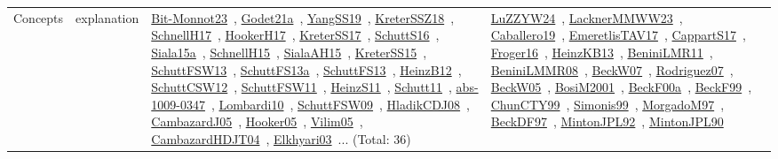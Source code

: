 {\begin{longtable}{lp{3cm}>{\raggedright\arraybackslash}p{6cm}>{\raggedright\arraybackslash}p{6cm}>{\raggedright\arraybackslash}p{8cm}}
\index{explanation}\index{Concepts!explanation}Concepts & explanation & \href{../works/Bit-Monnot23.pdf}{Bit-Monnot23}~\cite{Bit-Monnot23}, \href{../works/Godet21a.pdf}{Godet21a}~\cite{Godet21a}, \href{../works/YangSS19.pdf}{YangSS19}~\cite{YangSS19}, \href{../works/KreterSSZ18.pdf}{KreterSSZ18}~\cite{KreterSSZ18}, \href{../works/SchnellH17.pdf}{SchnellH17}~\cite{SchnellH17}, \href{../works/HookerH17.pdf}{HookerH17}~\cite{HookerH17}, \href{../works/KreterSS17.pdf}{KreterSS17}~\cite{KreterSS17}, \href{../works/SchuttS16.pdf}{SchuttS16}~\cite{SchuttS16}, \href{../works/Siala15a.pdf}{Siala15a}~\cite{Siala15a}, \href{../works/SchnellH15.pdf}{SchnellH15}~\cite{SchnellH15}, \href{../works/SialaAH15.pdf}{SialaAH15}~\cite{SialaAH15}, \href{../works/KreterSS15.pdf}{KreterSS15}~\cite{KreterSS15}, \href{../works/SchuttFSW13.pdf}{SchuttFSW13}~\cite{SchuttFSW13}, \href{../works/SchuttFS13a.pdf}{SchuttFS13a}~\cite{SchuttFS13a}, \href{../works/SchuttFS13.pdf}{SchuttFS13}~\cite{SchuttFS13}, \href{../works/HeinzB12.pdf}{HeinzB12}~\cite{HeinzB12}, \href{../works/SchuttCSW12.pdf}{SchuttCSW12}~\cite{SchuttCSW12}, \href{../works/SchuttFSW11.pdf}{SchuttFSW11}~\cite{SchuttFSW11}, \href{../works/HeinzS11.pdf}{HeinzS11}~\cite{HeinzS11}, \href{../works/Schutt11.pdf}{Schutt11}~\cite{Schutt11}, \href{../works/abs-1009-0347.pdf}{abs-1009-0347}~\cite{abs-1009-0347}, \href{../works/Lombardi10.pdf}{Lombardi10}~\cite{Lombardi10}, \href{../works/SchuttFSW09.pdf}{SchuttFSW09}~\cite{SchuttFSW09}, \href{../works/HladikCDJ08.pdf}{HladikCDJ08}~\cite{HladikCDJ08}, \href{../works/CambazardJ05.pdf}{CambazardJ05}~\cite{CambazardJ05}, \href{../works/Hooker05.pdf}{Hooker05}~\cite{Hooker05}, \href{../works/Vilim05.pdf}{Vilim05}~\cite{Vilim05}, \href{../works/CambazardHDJT04.pdf}{CambazardHDJT04}~\cite{CambazardHDJT04}, \href{../works/Elkhyari03.pdf}{Elkhyari03}~\cite{Elkhyari03}... (Total: 36) & \href{../works/LuZZYW24.pdf}{LuZZYW24}~\cite{LuZZYW24}, \href{../works/LacknerMMWW23.pdf}{LacknerMMWW23}~\cite{LacknerMMWW23}, \href{../works/Caballero19.pdf}{Caballero19}~\cite{Caballero19}, \href{../works/EmeretlisTAV17.pdf}{EmeretlisTAV17}~\cite{EmeretlisTAV17}, \href{../works/CappartS17.pdf}{CappartS17}~\cite{CappartS17}, \href{../works/Froger16.pdf}{Froger16}~\cite{Froger16}, \href{../works/HeinzKB13.pdf}{HeinzKB13}~\cite{HeinzKB13}, \href{../works/BeniniLMR11.pdf}{BeniniLMR11}~\cite{BeniniLMR11}, \href{../works/BeniniLMMR08.pdf}{BeniniLMMR08}~\cite{BeniniLMMR08}, \href{../works/BeckW07.pdf}{BeckW07}~\cite{BeckW07}, \href{../works/Rodriguez07.pdf}{Rodriguez07}~\cite{Rodriguez07}, \href{../works/BeckW05.pdf}{BeckW05}~\cite{BeckW05}, \href{../works/BosiM2001.pdf}{BosiM2001}~\cite{BosiM2001}, \href{../works/BeckF00a.pdf}{BeckF00a}~\cite{BeckF00a}, \href{../works/BeckF99.pdf}{BeckF99}~\cite{BeckF99}, \href{../works/ChunCTY99.pdf}{ChunCTY99}~\cite{ChunCTY99}, \href{../works/Simonis99.pdf}{Simonis99}~\cite{Simonis99}, \href{../works/MorgadoM97.pdf}{MorgadoM97}~\cite{MorgadoM97}, \href{../works/BeckDF97.pdf}{BeckDF97}~\cite{BeckDF97}, \href{../works/MintonJPL92.pdf}{MintonJPL92}~\cite{MintonJPL92}, \href{../works/MintonJPL90.pdf}{MintonJPL90}~\cite{MintonJPL90} & 
\end{longtable}}
